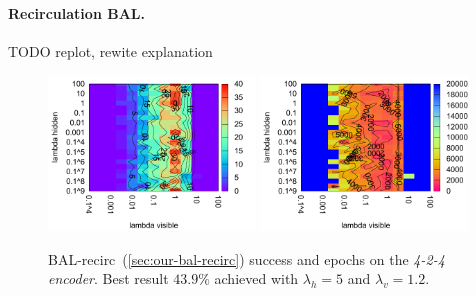 \paragraph{Recirculation BAL.} 
TODO replot, rewite explanation 
\begin{figure}[H]
  \centering
  \includegraphics[width=0.49\textwidth]{img/bal-recirc-auto4-success.pdf}   
  \includegraphics[width=0.49\textwidth]{img/bal-recirc-auto4-epoch.pdf}     
  \caption{BAL-recirc~(\ref{sec:our-bal-recirc}) success and epochs on the \emph{4-2-4 encoder}. Best result $43.9\%$ achieved with $\lambda_h=5$ and $\lambda_v=1.2$.}
  \label{fig:results-bal-recirc-auto4-performance}
\end{figure}

